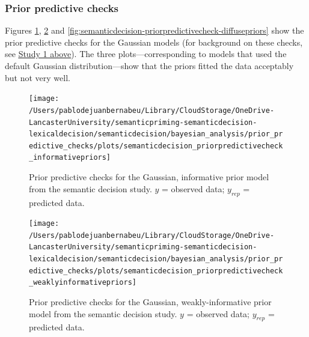 \documentclass[
  12pt,
  man,floatsintext]{apa7}
\begin{document}
\hypertarget{prior-predictive-checks-1}{%
\subsubsection{Prior predictive checks}\label{prior-predictive-checks-1}}

Figures \ref{fig:semanticdecision-priorpredictivecheck-informativepriors}, \ref{fig:semanticdecision-priorpredictivecheck-weaklyinformativepriors} and \ref{fig:semanticdecision-priorpredictivecheck-diffusepriors} show the prior predictive checks for the Gaussian models (for background on these checks, see \protect\hyperlink{study1-bayesian-diagnostics}{\underline{Study 1 above}}). The three plots---corresponding to models that used the default Gaussian distribution---show that the priors fitted the data acceptably but not very well.



\begin{figure}

{\centering \texttt{[image: /Users/pablodejuanbernabeu/Library/CloudStorage/OneDrive-LancasterUniversity/semanticpriming-semanticdecision-lexicaldecision/semanticdecision/bayesian\_analysis/prior\_predictive\_checks/plots/semanticdecision\_priorpredictivecheck\_informativepriors]} 

}

\caption{Prior predictive checks for the Gaussian, informative prior model from the semantic decision study. \(y\) = observed data; \(y_{rep}\) = predicted data.}\label{fig:semanticdecision-priorpredictivecheck-informativepriors}
\end{figure}



\begin{figure}

{\centering \texttt{[image: /Users/pablodejuanbernabeu/Library/CloudStorage/OneDrive-LancasterUniversity/semanticpriming-semanticdecision-lexicaldecision/semanticdecision/bayesian\_analysis/prior\_predictive\_checks/plots/semanticdecision\_priorpredictivecheck\_weaklyinformativepriors]} 

}

\caption{Prior predictive checks for the Gaussian, weakly-informative prior model from the semantic decision study. \(y\) = observed data; \(y_{rep}\) = predicted data.}\label{fig:semanticdecision-priorpredictivecheck-weaklyinformativepriors}
\end{figure}
\end{document}
